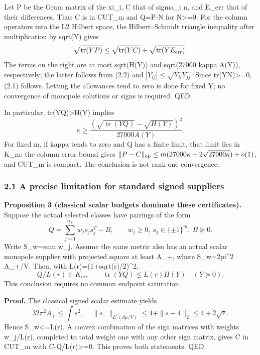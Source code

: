 \documentclass[
  10pt,
]{article}
\begin{document}
Let P be the Gram matrix of the xi\_i, C that of sigma\_i n, and E\_err
that of their differences. Thus C is in CUT\_m and Q=P-N for
N\textgreater=0. For the column operators into the L2 Hilbert space, the
Hilbert--Schmidt triangle inequality after multiplication by sqrt(Y)
gives \[
 \sqrt{\operatorname{tr}(YP)}\le\sqrt{\operatorname{tr}(YC)}
                                      +\sqrt{\operatorname{tr}(YE_{\rm err})}.
\] The terms on the right are at most sqrt(H(Y)) and sqrt(27000 kappa
A(Y)), respectively; the latter follows from (2.2) and
\(|Y_{ij}|\le\sqrt{Y_{ii}Y_{jj}}\). Since tr(YN)\textgreater=0, (2.1)
follows. Letting the allowances tend to zero is done for fixed Y; no
convergence of monopole solutions or signs is required. QED.

In particular, tr(YQ)\textgreater H(Y) implies \[
 \kappa\ge
 \frac{(\sqrt{\operatorname{tr}(YQ)}-\sqrt{H(Y)})^2}{27000A(Y)}. \tag{2.3}
\] For fixed m, if kappa tends to zero and Q has a finite limit, that
limit lies in K\_m: the column error bound gives
\(\|P-C\|_{\rm op}\le m(27000\kappa+2\sqrt{27000\kappa})+o(1)\), and
CUT\_m is compact. The conclusion is not rank-one convergence.

\hypertarget{a-precise-limitation-for-standard-signed-suppliers}{%
\subsubsection{2.1 A precise limitation for standard signed
suppliers}\label{a-precise-limitation-for-standard-signed-suppliers}}

\textbf{Proposition 3 (classical scalar budgets dominate these
certificates).} Suppose the actual selected classes have pairings of the
form \[
 Q=\sum_{j=1}^{n_+} w_j s_js_j^T-B,\qquad
 w_j\ge0,\ s_j\in\{\pm1\}^m,\ B\succeq0.                \tag{2.4}
\] Write S\_w=sum w\_j. Assume the same metric also has an actual scalar
monopole supplier with projected square at least A\_+, where
S\_w=2pi\^{}2 A\_+/V. Then, with L(r)=(1+sqrt(r)/2)\^{}2, \[
 Q/L(r)\in K_m,\qquad
 \operatorname{tr}(YQ)\le L(r)H(Y)\quad(Y\succeq0).      \tag{2.5}
\] This conclusion requires no common endpoint saturation.

\textbf{Proof.} The classical signed scalar estimate yields \[
 32\pi^2 A_+\le\int s_-^2,
 \quad\|s_-\|_{L^2(d\mu/V)}\le4+\|s+4\|_2\le4+2\sqrt r.
\] Hence S\_w\textless=L(r). A convex combination of the sign matrices
with weights w\_j/L(r), completed to total weight one with any other
sign matrix, gives C in CUT\_m with C-Q/L(r)\textgreater=0. This proves
both statements. QED.
\end{document}
